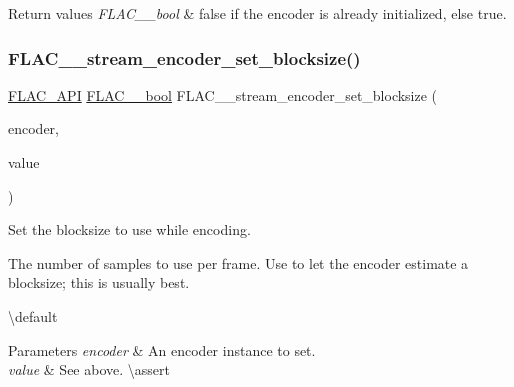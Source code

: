 \begin{DoxyRetVals}{Return values}
{\em F\+L\+A\+C\+\_\+\+\_\+bool} & {\ttfamily false} if the encoder is already initialized, else {\ttfamily true}. \\
\hline
\end{DoxyRetVals}
\mbox{\label{group__flac__stream__encoder_gae6c001cd7601192334c58ee3631b571f}} 
\subsubsection{\texorpdfstring{FLAC\_\_stream\_encoder\_set\_blocksize()}{FLAC\_\_stream\_encoder\_set\_blocksize()}}
{\footnotesize\ttfamily \mbox{\hyperlink{group__flac__export_ga56ca07df8a23310707732b1c0007d6f5}{F\+L\+A\+C\+\_\+\+A\+PI}} \mbox{\hyperlink{ordinals_8h_a95103469f1cbd78b8cf250194985b34e}{F\+L\+A\+C\+\_\+\+\_\+bool}} F\+L\+A\+C\+\_\+\+\_\+stream\+\_\+encoder\+\_\+set\+\_\+blocksize (\begin{DoxyParamCaption}\item[{\mbox{\hyperlink{struct_f_l_a_c_____stream_encoder}{F\+L\+A\+C\+\_\+\+\_\+\+Stream\+Encoder}} $\ast$}]{encoder,  }\item[{unsigned}]{value }\end{DoxyParamCaption})}

Set the blocksize to use while encoding.

The number of samples to use per frame. Use {} to let the encoder estimate a blocksize; this is usually best.

\textbackslash{}default {} 
\begin{DoxyParams}{Parameters}
{\em encoder} & An encoder instance to set. \\
\hline
{\em value} & See above. \textbackslash{}assert 
\begin{DoxyCode}{1}
\end{DoxyCode}
 \\
\hline
\end{DoxyParams}

